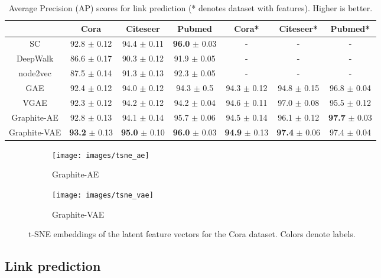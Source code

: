 \documentclass{article}
\newcommand{\name}{Graphite}
\begin{document}
\normalsize
\begin{table*}[t]
  \caption{Average Precision (AP) scores for link prediction (* denotes dataset with features). Higher is better.}
  \label{table-ap}
  \centering
   \vspace{0.05in}
  \begin{tabular}{|c|c|c|c|c|c|c|}
    \toprule
	& Cora & Citeseer & Pubmed & Cora* & Citeseer* & Pubmed* \\
    \midrule
    SC & 92.8 $\pm$ 0.12 & 94.4 $\pm$ 0.11& \textbf{96.0} $\pm$ 0.03 & - & - & -\\
    DeepWalk & 86.6 $\pm$ 0.17& 90.3 $\pm$ 0.12& 91.9 $\pm$ 0.05& - & - & -\\
    node2vec & 87.5 $\pm$ 0.14& 91.3 $\pm$ 0.13& 92.3 $\pm$ 0.05 & - & - & -\\
    GAE & 92.4 $\pm$ 0.12& 94.0 $\pm$ 0.12& 94.3 $\pm$ 0.5& 94.3 $\pm$ 0.12& 94.8 $\pm$ 0.15& 96.8 $\pm$ 0.04\\
    VGAE & 92.3 $\pm$ 0.12& 94.2 $\pm$ 0.12& 94.2 $\pm$ 0.04& 94.6 $\pm$ 0.11& 97.0 $\pm$ 0.08& 95.5 $\pm$ 0.12\\
    \midrule
\name-AE & 92.8 $\pm$ 0.13& 94.1 $\pm$ 0.14& 95.7 $\pm$ 0.06& 94.5 $\pm$ 0.14& 96.1 $\pm$ 0.12& \textbf{97.7} $\pm$ 0.03 \\
\name-VAE & \textbf{93.2} $\pm$ 0.13 & \textbf{95.0} $\pm$ 0.10 & \textbf{96.0} $\pm$ 0.03 & \textbf{94.9} $\pm$ 0.13 & \textbf{97.4} $\pm$ 0.06 & 97.4 $\pm$ 0.04\\

    \bottomrule
  \end{tabular}
\end{table*}

\normalsize

\begin{figure}[ht]
\centering
\begin{subfigure}[b]{0.45\textwidth}
\centering
\texttt{[image: images/tsne\_ae]}
\caption{Graphite-AE}
\end{subfigure}
\begin{subfigure}[b]{0.45\textwidth}
\centering
\texttt{[image: images/tsne\_vae]}
\caption{Graphite-VAE}
\end{subfigure}
\caption{t-SNE embeddings of the latent feature vectors for the Cora dataset. Colors denote labels.}\label{fig:tsne_clustering} 
\vspace{-0.05in}
\end{figure}


\subsection{Link prediction}
\end{document}
